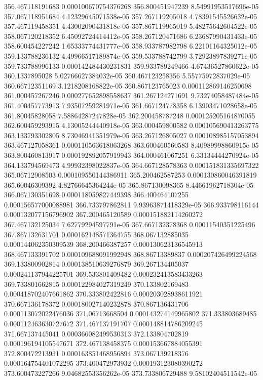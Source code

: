 {356.467118191683 0.000100670754376268
356.800451947239 8.54991953517696e-05
357.067118951684 4.12329645071538e-05
357.267119205018 4.78391545526632e-05
357.467119458351 4.43002090431818e-05
357.867119965019 5.48275642604522e-05
358.067120218352 6.45092724414412e-05
358.267120471686 6.23687990431433e-05
358.600454227242 1.65333774431777e-05
358.933787982798 6.22101164325012e-05
359.133788236132 4.49966517189874e-05
359.533788742799 3.72923897839271e-05
359.733788996133 0.000142484430231831
359.933789249466 4.67436527860622e-05
360.1337895028 5.02766627384032e-05
360.467123258356 5.55775972837029e-05
360.66712351169 3.1218208168822e-05
360.867123765023 0.000112869146250698
361.000457267246 0.000277652898558637
361.267124271691 9.73274058487484e-05
361.400457773913 7.93507259281971e-05
361.667124778358 6.13903471028658e-05
361.80045828058 7.58864287247828e-05
362.200458787248 0.000125205164870055
362.600459293915 4.13005244440918e-05
363.000459800582 0.000105690413263775
363.133793302805 8.73046941351979e-05
363.267126805027 0.000108985157053894
363.467127058361 0.000110563618063268
363.600460560583 8.40989998860915e-05
363.800460813917 0.000192892057919943
364.000461067251 6.33134444270924e-05
364.133794569473 4.99932398022837e-05
364.667128578363 0.000151831335697322
365.06712908503 0.000109550144386911
365.200462587253 0.000130860046391819
365.60046309392 4.82766645364244e-05
365.867130098365 8.44661962718304e-05
366.067130351698 0.000118059827449398
366.400464107255 0.000156577000088981
366.733797862811 9.93963871418329e-05
366.933798116144 0.000132077156796902
367.200465120589 0.000151882114260272
367.467132125034 7.62779294597791e-05
367.667132378368 0.00011540351225496
367.867132631701 0.000162148571364755
368.067132885035 0.000144062350309539
368.200466387257 0.000130623136545913
368.467133391702 0.000109688091992948
368.86713389837 0.000207426499224568
369.133800902814 0.000138510639276879
369.267134405037 0.000241137944225701
369.533801409482 0.000232413583433263
369.733801662815 0.000122984027319249
370.133802169483 0.000418702407661862
370.333802422816 0.000203028938611921
370.667136178372 0.000180027140232878
370.867136431706 0.000113072022476036
371.06713668504 0.000143274149965802
371.333803689485 0.000112463630727672
371.467137191707 0.000148814786209245
371.667137445041 0.000366082499530313
372.133804702819 0.000196194105547671
372.467138458375 0.000153667884055391
372.800472213931 0.000163851468956894
373.067139218376 0.000164754401072295
373.400472973932 0.000193123080390272
373.600473227266 9.04682553356262e-05
373.733806729488 9.58102404511542e-05
}
